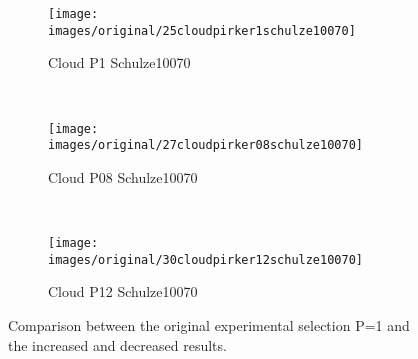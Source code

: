 \begin{figure}[htp] \centering
    \begin{subfigure}[b]{0.96\columnwidth}
        \texttt{[image: images/original/25cloudpirker1schulze10070]}
        \caption{Cloud P1 Schulze10070}
        \label{fig:25cloudpirker1schulze10070}
    \end{subfigure}\\
    \begin{subfigure}[b]{0.96\columnwidth}
        \texttt{[image: images/original/27cloudpirker08schulze10070]}
        \caption{Cloud P08 Schulze10070}
        \label{fig:27cloudpirker08schulze10070} 
    \end{subfigure}\\
    \begin{subfigure}[b]{0.96\columnwidth}
        \texttt{[image: images/original/30cloudpirker12schulze10070]}
        \caption{Cloud P12 Schulze10070}
        \label{fig:30cloudpirker12schulze10070} 
    \end{subfigure}
    \caption{Comparison between the original experimental selection P=1 and the
    increased and decreased results.}
    \label{fig:29schulzeradarandcloud}
\end{figure}